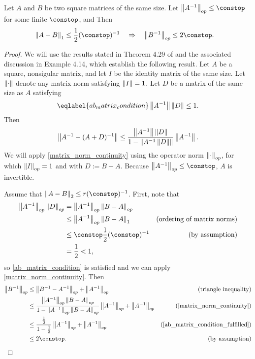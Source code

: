 \begin{prop}
\label{propref:operator_norm_continuity}
%
Let $A$ and $B$ be two square matrices of the same size.
Let $\norm{A^{-1}}_{op}\le \constop$ for some finite $\constop$, and  Then
%
\begin{align*}
\norm{A-B}_{1}\le \frac{1}{2} (\constop)^{-1} &
    \quad\Rightarrow\quad\norm{B^{-1}}_{op} \le 2 \constop.
\end{align*}
%
\begin{proof}
%
We will use the results stated in Theorem 4.29 of \citet{schott:2016:matrix} and
the associated discussion in Example 4.14, which establish the following result.
Let $A$ be a square, nonsigular matrix, and let $I$ be the identity matrix of
the same size.  Let $\left\Vert \cdot\right\Vert$ denote any matrix norm satisfying $\left\Vert I\right\Vert =
1$.  Let $D$ be a matrix of the same size as $A$ satisfying
%
\begin{align}\eqlabel{ab_matrix_condition}
\norm{A^{-1}} \norm{D} \le 1.
\end{align}
%
Then
%
\begin{align}\label{eq:matrix_norm_continuity}
    \left\Vert A^{-1} - (A + D)^{-1}\right\Vert \le
    \frac{\left\Vert A^{-1}\right\Vert\left\Vert D\right\Vert}{1 - \left\Vert A^{-1}\left\Vert D\right\Vert\right\Vert} \left\Vert A^{-1}\right\Vert.
\end{align}
%
We will apply \eqref{matrix_norm_continuity} using the operator norm
$\left\Vert \cdot\right\Vert_{op}$, for which $\left\Vert I\right\Vert_{op}=1$ and with $D := B - A$.
Because $\norm{A^{-1}}_{op}\le \constop$, $A$ is invertible.

Assume that $\norm{A-B}_{2}\le r (\constop)^{-1}$.  First, note that
%
\begin{align}\label{eq:ab_matrix_condition_fulfilled}
\norm{A^{-1}}_{op} \norm{D}_{op} &=
    \norm{A^{-1}}_{op}\norm{B - A}_{op} \nonumber \\
&\le\norm{A^{-1}}_{op}\norm{B - A}_{1}
    & \textrm{(ordering of matrix norms)}\nonumber \\
 & \le \constop \frac{1}{2} (\constop)^{-1}
    & \textrm{(by assumption)} \nonumber \\
&= \frac{1}{2}  < 1,
\end{align}
%
so \eqref{ab_matrix_condition} is satisfied and we can apply
\eqref{matrix_norm_continuity}. Then
%
\begin{align*}
\norm{B^{-1}}_{op}
 & \le \norm{B^{-1}-A^{-1}}_{op} + \norm{A^{-1}}_{op}
    & \textrm{ (triangle inequality)}\\
 & \le \frac{\norm{A^{-1}}_{op}\norm{B - A}_{op}}
            {1 - \norm{A^{-1}}_{op}\norm{B - A}_{op}}
        \norm{A^{-1}}_{op} + \norm{A^{-1}}_{op}
     & \textrm{(\eqref{matrix_norm_continuity})}\\
 & \le \frac{\frac{1}{2}}{1-\frac{1}{2}}\norm{A^{-1}}_{op} +
    \norm{A^{-1}}_{op}
    &\textrm{(\eqref{ab_matrix_condition_fulfilled})} \\
 & \le 2 \constop.&\textrm{(by assumption)}
\end{align*}
\end{proof}
%
\end{prop}






